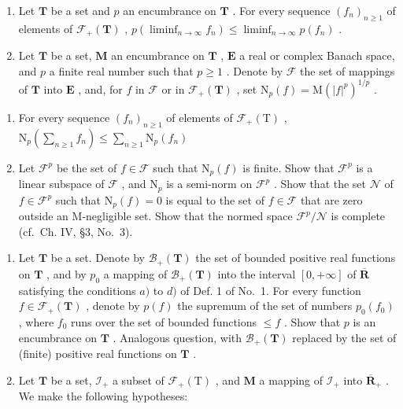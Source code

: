 \begin{enumerate}
\def\labelenumi{\arabic{enumi})}
\setcounter{enumi}{2}
\item
  Let \(\mathbf{T}\) be a set and \(p\) an encumbrance on \(\mathbf{T}\) . For every sequence \((f_n)_{n\geqslant 1}\) of elements of \(\mathcal{F}_{+}(\mathbf{T})\) , \(p(\liminf_{n\to \infty}f_n)\leqslant \liminf_{n\to \infty}p(f_n)\) .
\item
  Let \(\mathbf{T}\) be a set, \(\mathbf{M}\) an encumbrance on \(\mathbf{T}\) , \(\mathbf{E}\) a real or complex Banach space, and \(p\) a finite real number such that \(p \geqslant 1\) . Denote by \(\mathcal{F}\) the set of mappings of \(\mathbf{T}\) into \(\mathbf{E}\) , and, for \(f\) in \(\mathcal{F}\) or in \(\mathcal{F}_{+}(\mathbf{T})\) , set \(\mathrm{N}_p(f) = \mathrm{M}(|f|^p)^{1/p}\) .
\end{enumerate}

\begin{enumerate}
\def\labelenumi{\alph{enumi})}
\item
  For every sequence \((f_n)_{n\geqslant 1}\) of elements of \(\mathcal{F}_{+}(\mathrm{T})\) , \(\mathrm{N}_p\left(\sum_{n\geqslant 1}f_n\right)\leqslant \sum_{n\geqslant 1}\mathrm{N}_p(f_n)\)
\item
  Let \(\mathcal{F}^p\) be the set of \(f \in \mathcal{F}\) such that \(\mathrm{N}_p(f)\) is finite. Show that \(\mathcal{F}^p\) is a linear subspace of \(\mathcal{F}\) , and \(\mathrm{N}_p\) is a semi-norm on \(\mathcal{F}^p\) . Show that the set \(\mathcal{N}\) of \(f \in \mathcal{F}^p\) such that \(\mathrm{N}_p(f) = 0\) is equal to the set of \(f \in \mathcal{F}\) that are zero outside an M-negligible set. Show that the normed space \(\mathcal{F}^p / \mathcal{N}\) is complete (cf.~Ch. IV, §3, No.~3).
\end{enumerate}

\begin{enumerate}
\def\labelenumi{\arabic{enumi})}
\setcounter{enumi}{4}
\item
  Let \(\mathbf{T}\) be a set. Denote by \(\mathcal{B}_{+}(\mathbf{T})\) the set of bounded positive real functions on \(\mathbf{T}\) , and by \(p_0\) a mapping of \(\mathcal{B}_{+}(\mathbf{T})\) into the interval \([0, +\infty]\) of \(\overline{\mathbf{R}}\) satisfying the conditions \(a)\) to \(d)\) of Def. 1 of No.~1. For every function \(f \in \mathcal{F}_{+}(\mathbf{T})\) , denote by \(p(f)\) the supremum of the set of numbers \(p_0(f_0)\) , where \(f_0\) runs over the set of bounded functions \(\leqslant f\) . Show that \(p\) is an encumbrance on \(\mathbf{T}\) . Analogous question, with \(\mathcal{B}_{+}(\mathbf{T})\) replaced by the set of (finite) positive real functions on \(\mathbf{T}\) .
\item
  Let \(\mathbf{T}\) be a set, \(\mathcal{I}_{+}\) a subset of \(\mathcal{F}_{+}(\mathrm{T})\) , and \(\mathbf{M}\) a mapping of \(\mathcal{I}_{+}\) into \(\overline{\mathbf{R}}_{+}\) . We make the following hypotheses:
\end{enumerate}

